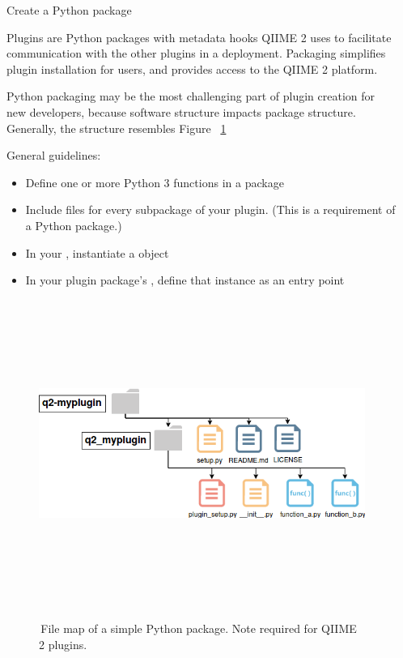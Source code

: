 \documentclass[final]{beamer}
\newlength{\sepwidth}
\newlength{\colwidth}
\newcommand{\separatorcolumn}{\begin{column}{\sepwidth}\end{column}}
\begin{document}
\begin{frame}[t]
\begin{columns}[t]
\separatorcolumn

\begin{column}{\colwidth}

  \begin{block}{Create a Python package}

    Plugins are Python packages with metadata hooks QIIME 2 uses to facilitate
    communication with the other plugins in a deployment. Packaging
    simplifies plugin installation for users, and provides access to the QIIME 2 platform.

    \begin{tcolorbox}
    [width=\textwidth, colframe=blue]
    {Python packaging may be the most challenging part of plugin creation
    for new developers, because software structure impacts package structure.
    Generally, the structure resembles Figure ~\ref{fig:packageStructure}}
    \end{tcolorbox}

    General guidelines:
    \begin{itemize}
      \item Define one or more Python 3 functions in a package
      \item Include  files for every subpackage of your
      plugin. (This is a requirement of a Python package.)
      \item In your , instantiate a  object
      \item In your plugin package's , define that instance as an entry point
    \end{itemize}
  \end{block}

  \begin{figure}[tph!]
    {\includegraphics[height=10cm]{assets/packageStructure}}
    \caption{\,File map of a simple Python package. Note  required for QIIME 2 plugins.}
    \label{fig:packageStructure}
  \end{figure}


\end{column}
\end{columns}
\end{frame}
\end{document}
